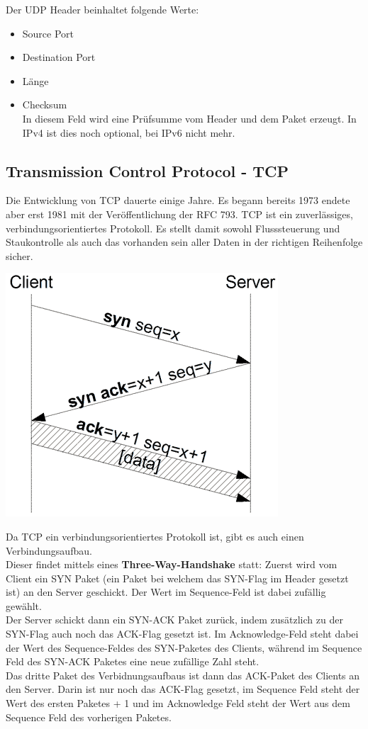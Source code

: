 \documentclass[11pt,a4paper]{report}
\begin{document}
Der UDP Header beinhaltet folgende Werte: 
\begin{itemize}
\item Source Port
\item Destination Port
\item Länge
\item Checksum\\
In diesem Feld wird eine Prüfsumme vom Header und dem Paket erzeugt. In IPv4 ist dies noch optional, bei IPv6 nicht mehr.
\end{itemize}
\subsection{Transmission Control Protocol - TCP}
Die Entwicklung von TCP dauerte einige Jahre. Es begann bereits 1973 endete aber erst 1981 mit der Veröffentlichung der RFC 793. TCP ist ein zuverlässiges, verbindungsorientiertes Protokoll. Es stellt damit sowohl Flusssteuerung und Staukontrolle als auch das vorhanden sein aller Daten in der richtigen Reihenfolge sicher.\\

\begin{center}
\includegraphics[scale=0.6]{../docs/tarkes/pics/TcpHandshake.png}
\end{center}

Da TCP ein verbindungsorientiertes Protokoll ist, gibt es auch einen Verbindungsaufbau.\\
Dieser findet mittels eines \textbf{Three-Way-Handshake} statt: Zuerst wird vom Client ein SYN Paket (ein Paket bei welchem das SYN-Flag im Header gesetzt ist) an den Server geschickt. Der Wert im Sequence-Feld ist dabei zufällig gewählt.\\
Der Server schickt dann ein SYN-ACK Paket zurück, indem zusätzlich zu der SYN-Flag auch noch das ACK-Flag gesetzt ist. Im Acknowledge-Feld steht dabei der Wert des Sequence-Feldes des SYN-Paketes des Clients, während im Sequence Feld des SYN-ACK Paketes eine neue zufällige Zahl steht.\\
Das dritte Paket des Verbidnungsaufbaus ist dann das ACK-Paket des Clients an den Server. Darin ist nur noch das ACK-Flag gesetzt, im Sequence Feld steht der Wert des ersten Paketes + 1 und im Acknowledge Feld steht der Wert aus dem Sequence Feld des vorherigen Paketes.\\
\end{document}
